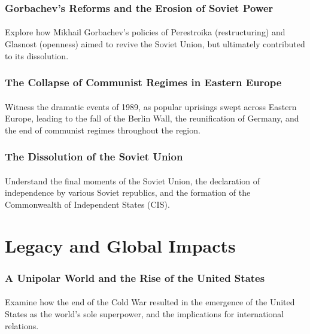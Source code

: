 \documentclass[a4paper,12pt]{book}
\begin{document}
\subsubsection*{Gorbachev’s Reforms and the Erosion of Soviet Power}
\paragraph{}
Explore how Mikhail Gorbachev’s policies of Perestroika (restructuring) and Glasnost (openness) aimed to revive the Soviet Union, but ultimately contributed to its dissolution.

\subsubsection*{The Collapse of Communist Regimes in Eastern Europe}
\paragraph{}
Witness the dramatic events of 1989, as popular uprisings swept across Eastern Europe, leading to the fall of the Berlin Wall, the reunification of Germany, and the end of communist regimes throughout the region.

\subsubsection*{The Dissolution of the Soviet Union}
\paragraph{}
Understand the final moments of the Soviet Union, the declaration of independence by various Soviet republics, and the formation of the Commonwealth of Independent States (CIS).

\section*{Legacy and Global Impacts}
\paragraph{}
\subsubsection*{A Unipolar World and the Rise of the United States}
\paragraph{}
Examine how the end of the Cold War resulted in the emergence of the United States as the world’s sole superpower, and the implications for international relations.
\end{document}
